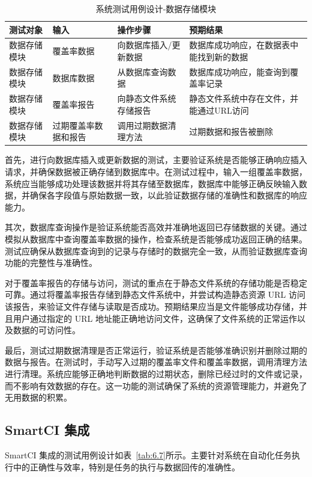 \begin{table}[ht]
\centering
\caption{系统测试用例设计-数据存储模块}
\label{tab:6.6}
\begin{tabular}{p{2.5cm}p{2.5cm}p{3.5cm}p{4cm}}
\toprule
\textbf{测试对象} & \textbf{输入} & \textbf{操作步骤} & \textbf{预期结果} \\
\midrule
数据存储模块 & 覆盖率数据 & 向数据库插入/更新数据 & 数据库成功响应，在数据表中能找到新的数据 \\
数据存储模块 & 数据库数据 & 从数据库查询数据 & 数据库成功响应，能查询到覆盖率记录 \\
数据存储模块 & 覆盖率报告 & 向静态文件系统存储报告 & 静态文件系统中存在文件，并能通过URL访问 \\
数据存储模块 & 过期覆盖率数据和报告 & 调用过期数据清理方法 & 过期数据和报告被删除 \\
\bottomrule
\end{tabular}
\end{table}

首先，进行向数据库插入或更新数据的测试，主要验证系统是否能够正确响应插入请求，并确保数据被正确存储到数据库中。在测试过程中，输入一组覆盖率数据，系统应当能够成功处理该数据并将其存储至数据库，数据库中能够正确反映输入数据，并确保各字段值与原始数据一致，以此验证数据存储的准确性和数据库的响应能力。

其次，数据库查询操作是验证系统能否高效并准确地返回已存储数据的关键。通过模拟从数据库中查询覆盖率数据的操作，检查系统是否能够成功返回正确的结果。测试应确保从数据库查询到的记录与存储时的数据完全一致，从而验证数据库查询功能的完整性与准确性。

对于覆盖率报告的存储与访问，测试的重点在于静态文件系统的存储功能是否稳定可靠。通过将覆盖率报告存储到静态文件系统中，并尝试构造静态资源 URL 访问该报告，来验证文件存储与读取是否成功。预期结果应当是文件能够成功存储，并且用户通过指定的 URL 地址能正确地访问文件，这确保了文件系统的正常运作以及数据的可访问性。

最后，测试过期数据清理是否正常运行，验证系统是否能够准确识别并删除过期的数据与报告。在测试时，手动写入过期的覆盖率文件和覆盖率数据，调用清理方法进行清理。系统应能够正确地判断数据的过期状态，删除已经过时的文件或记录，而不影响有效数据的存在。这一功能的测试确保了系统的资源管理能力，并避免了无用数据的积累。

\subsection{SmartCI 集成}
SmartCI 集成的测试用例设计如表~\ref{tab:6.7}所示。主要针对系统在自动化任务执行中的正确性与效率，特别是任务的执行与数据回传的准确性。

